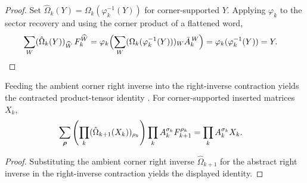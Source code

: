 \begin{proof}\leanok
    Set $\hat\Omega_k(Y)=\Omega_k(\varphi_k^{-1}(Y))$ for corner-supported $Y$.
    Applying $\varphi_k$ to the sector recovery and using the corner product of a
    flattened word,
    \begin{align}
        \sum_{W}(\hat\Omega_k(Y))_{\widehat W}\,F_k^{\widehat W}
         & =
        \varphi_k\Bigl(        \sum_{W}(\Omega_k(\varphi_k^{-1}(Y)))_{W}
        \bar A_k^{\,W}
        \Bigr)
        =
        \varphi_k(\varphi_k^{-1}(Y))
        =
        Y.
        \notag
    \end{align}
\end{proof}

\begin{lemma}
    \label{lem:periodic_sector_contraction}
    \leanok
    Feeding the ambient corner right inverse into the right-inverse contraction
    yields the contracted product-tensor identity
    \cite[eq.~resultprop]{DeLasCuevas2017Irreducible}. For corner-supported
    inserted matrices $X_k$,
    \begin{align}
        \sum_{\boldsymbol\rho}
        \left(\prod_k(\hat\Omega_{k+1}(X_k))_{\rho_k}\right)
        \prod_k A_k^{\sigma_k}F_{k+1}^{\rho_k}
         & =
        \prod_k A_k^{\sigma_k}X_k.
        \notag
    \end{align}
\end{lemma}

\begin{proof}\leanok
    Substituting the ambient corner right inverse $\hat\Omega_{k+1}$ for the
    abstract right inverse in the right-inverse contraction yields the
    displayed identity.
\end{proof}
